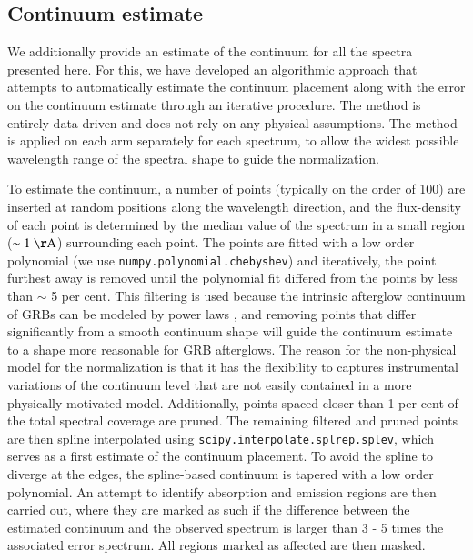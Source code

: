 \documentclass{aa}    %
\begin{document}
\subsection{Continuum estimate} \label{continuum}

We additionally provide an estimate of the continuum for all the spectra
presented here. For this, we have developed an algorithmic approach that
attempts to automatically estimate the continuum placement along with the error
on the continuum estimate through an iterative procedure. The method is entirely
data-driven and does not rely on any physical assumptions. The method is applied
on each arm separately for each spectrum, to allow the widest possible
wavelength range of the spectral shape to guide the normalization.

To estimate the continuum, a number of points (typically on the order of 100)
are inserted at random positions along the wavelength direction, and the
flux-density of each point is determined by the median value of the spectrum in
a small region ($\sim 1~\mathrm{\AA}$) surrounding each point. The points are
fitted with a low order polynomial (we use \texttt{numpy.polynomial.chebyshev})
and iteratively, the point furthest away is removed until the polynomial fit
differed from the points by less than $\sim$ 5 per cent. This filtering is used
because the intrinsic afterglow continuum of GRBs can be modeled by power laws
\citep{Piran2005}, and removing points that differ significantly from a smooth
continuum shape will guide the continuum estimate to a shape more reasonable for
GRB afterglows. The reason for the non-physical model for the normalization is
that it has the flexibility to captures instrumental variations of the continuum
level that are not easily contained in a more physically motivated model.
Additionally, points spaced closer than 1 per cent of the total spectral
coverage are pruned. The remaining filtered and pruned points are then spline
interpolated using \texttt{scipy.interpolate.splrep.splev}, which serves as a
first estimate of the continuum placement. To avoid the spline to diverge at the
edges, the spline-based continuum is tapered with a low order polynomial. An
attempt to identify absorption and emission regions are then carried out, where
they are marked as such if the difference between the estimated continuum and
the observed spectrum is larger than 3 - 5 times the associated error spectrum.
All regions marked as affected are then masked.
\end{document}
